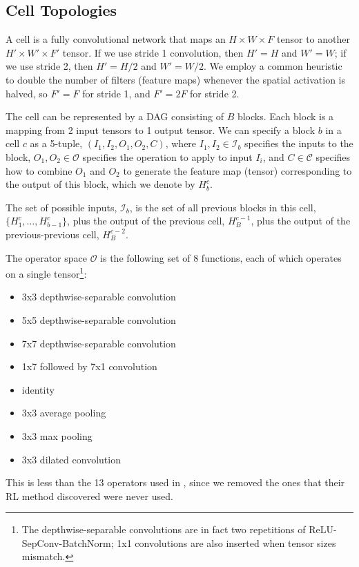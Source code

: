\documentclass[runningheads]{llncs}
\begin{document}
\subsection{Cell Topologies}

A cell is a fully convolutional network
that maps an $H \times W \times F$ tensor
to another $H' \times W' \times F'$ tensor.
If we use stride 1 convolution, then $H'=H$ and $W'=W$;
if we use stride 2, then $H'=H/2$ and $W'=W/2$.
We employ a common heuristic to double the number of filters (feature maps)
whenever the spatial activation is halved,
so $F'=F$ for stride 1, and $F'=2F$ for stride 2.

The cell can be represented 
by a DAG consisting of $B$ blocks. Each block is a mapping from 2 input
tensors to 1 output tensor.
We can specify a block $b$ in a cell $c$ as a 5-tuple,
$(I_1, I_2, O_1, O_2, C)$,
where
$I_1, I_2 \in \mathcal{I}_b$ specifies the 
inputs to the block,
$O_1, O_2 \in \mathcal{O}$ specifies the operation to apply to input $I_i$,
and $C \in \mathcal{C}$ specifies how to combine $O_1$ and $O_2$ to generate the feature map (tensor) corresponding to  the output of this block,
which we denote by $H_b^c$.

The set of possible inputs,
 $\mathcal{I}_b$, is the
set of all previous blocks in this cell,
$\{H_1^c,\ldots,H^c_{b-1}\}$,
plus the output of the previous cell,
$H_B^{c-1}$,
plus the output of the previous-previous cell,
$H_B^{c-2}$.

The operator space  $\mathcal{O}$
is the following set of 8 functions, each of which
operates on a single tensor\footnote{The depthwise-separable convolutions are in fact two repetitions of ReLU-SepConv-BatchNorm; 1x1 convolutions are also inserted when tensor sizes mismatch.}:

\begin{minipage}{0.5\textwidth}
\renewcommand\labelitemi{$\bullet$}
\footnotesize
\bigbreak
\begin{itemize}
\item 3x3 depthwise-separable convolution
\item 5x5 depthwise-separable convolution
\item 7x7 depthwise-separable convolution
\item 1x7 followed by 7x1 convolution
\end{itemize}
\bigbreak
\end{minipage}\begin{minipage}{0.5\textwidth}
\renewcommand\labelitemi{$\bullet$}
\footnotesize
\bigbreak
\begin{itemize}
\item identity
\item 3x3 average pooling
\item 3x3 max pooling
\item 3x3 dilated convolution
\end{itemize}
\bigbreak
\end{minipage}%
This is less than the 13 operators used in \cite{DBLP:journals/corr/ZophVSL17},
since 
we removed the ones that their RL method discovered were never used.
 
\end{document}
